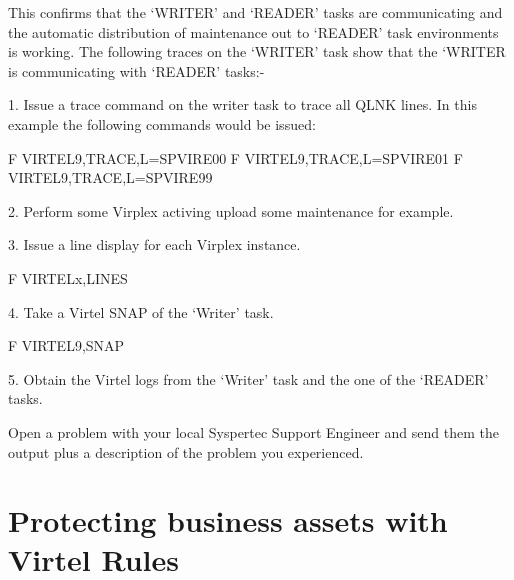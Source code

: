 \documentclass[letterpaper,10pt,english]{sphinxmanual}
\begin{document}

This confirms that the ‘WRITER’ and ‘READER’ tasks are communicating and the automatic distribution of maintenance out to ‘READER’ task environments is working. The following traces on the ‘WRITER’ task show that the ‘WRITER is communicating with ‘READER’ tasks:-


\ignorespaces 
{}

\begin{sphinxVerbatim}[commandchars=\\\{\}]
1.  Issue a trace command on the writer task to trace all QLNK lines. In this example the following commands would be issued:\PYGZhy{}

F VIRTEL9,TRACE,L=SPVIRE00
F VIRTEL9,TRACE,L=SPVIRE01
F VIRTEL9,TRACE,L=SPVIRE99


2.  Perform some Virplex activing \textendash{} upload some maintenance for example.

3.  Issue a line display for each Virplex instance.

F VIRTELx,LINES

4.  Take a Virtel SNAP of the ‘Writer’ task.

F VIRTEL9,SNAP

5.  Obtain the Virtel logs from the ‘Writer’ task and the one of the ‘READER’ tasks.

Open a problem with your local Syspertec Support Engineer and send them the output plus a description of the problem you experienced.
\end{sphinxVerbatim}

\ignorespaces 

\chapter{Protecting business assets with Virtel Rules}
\label{\detokenize{connectivity_guide:protecting-business-assets-with-virtel-rules}}\label{\detokenize{connectivity_guide:index-187}}
\end{document}
